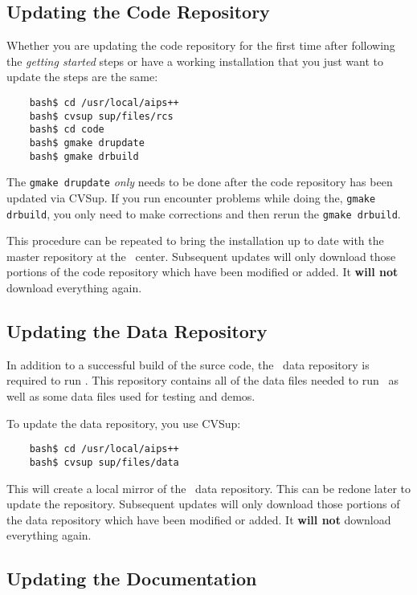\subsection{Updating the Code Repository}
\label{developer release code repository}

Whether you are updating the code repository for the first time after following
the {\em getting started} steps or have a working installation that you just
want to update the steps are the same:
\begin{verbatim}
    bash$ cd /usr/local/aips++
    bash$ cvsup sup/files/rcs
    bash$ cd code
    bash$ gmake drupdate
    bash$ gmake drbuild
\end{verbatim}
The \verb+gmake drupdate+ {\em only} needs to be done after the code repository
has been updated via CVSup. If you run encounter problems while doing the,
\verb+gmake drbuild+, you only need to make corrections and then rerun
the \verb+gmake drbuild+.

This procedure can be repeated to bring the installation up to date with
the master repository at the \aipspp\ center. Subsequent updates will only download
those portions of the code repository which have been modified or added. It
{\bf will not} download everything again.

\subsection{Updating the Data Repository}
\label{developer release data repository}

In addition to a successful build of the surce code, the \aipspp\ data repository
is required to run \aipspp. This repository contains all of the data files needed
to run \aipspp\ as well as some data files used for testing and demos.

To update the data repository, you use CVSup:
\begin{verbatim}
    bash$ cd /usr/local/aips++
    bash$ cvsup sup/files/data
\end{verbatim}
This will create a local mirror of the \aipspp\ data repository. This can be
redone later to update the repository. Subsequent updates will only download
those portions of the data repository which have been modified or added. It
{\bf will not} download everything again.

\subsection{Updating the Documentation }
\label{developer release documentation}

